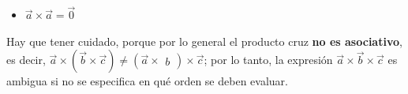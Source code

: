 \documentclass[12pt, fleqn]{report}                             %
\newenvironment{SmallIndentation}[1][0.75em]                    %
        {\begin{adjustwidth}{#1}{}\begin{footnotesize}}             %
        {\end{footnotesize}\end{adjustwidth}}                       %
\DeclareMathOperator \Space {\quad}                             %
\newcommand \Remember[1]{\Space\text{\scriptsize{#1}}}          %
\theoremstyle{break}                                            %
\newcommand{\Wrap}[1]{\left( #1 \right)}                        %
\newcommand{\abs}[1]{\left\lvert #1 \right\lvert}               %
\newcommand{\Abs}[1]{\left\lVert #1 \right\lVert}               %
\newcommand{\Vector}[1]                                         %
        { \ensuremath{\begin{matrix}#1\end{matrix}} }               %
\newcommand{\Sin}[1]{\sin\Wrap{#1}}                             %
\begin{document}
\begin{itemize}
\begin{SmallIndentation}[1em]
                            Por lo tanto:
                            \begin{align*}
                                \Abs{(k\vec{a}) \times \vec{b}} 
                                    &= \Abs{k\vec{a}} \Abs{\vec{b}} \Sin{\pi-\theta}        &&\Remember{Definición de producto cruz}    \\
                                    &= \abs{k} \Abs{\vec{a}} \Abs{\vec{b}} \Sin{\pi-\theta} &&\Remember{Propiedad de la magnitud}       \\
                                    &= \abs{k} \Abs{\vec{a}} \Abs{\vec{b}} \sin \theta      &&\Remember{Identidad trigonométrica}       \\
                                    &= \abs{k} \Abs{\vec{a} \times \vec{b}}                 &&\Remember{Definición de producto cruz}    \\
                                    &= \Abs{k\Wrap{\vec{a} \times \vec{b}}}                 &&\Remember{Propiedad de la magnitud}
                            \end{align*}
                            Por lo tanto, también en este caso tenemos que:
                            $\Wrap{k\vec{a}} \times \vec{b} = k\Wrap{\vec{a} \times \vec{b}}$.
                            
                            Se queda como ejercicio ver que $k\Wrap{\vec{a} \times \vec{b}} = \vec{a} \times \Wrap{k \vec{b}}$
                                
                        \end{SmallIndentation}
                    
                    \item $\vec{a} \times \vec{a} = \vec{0}$

                \end{itemize}
            
                Hay que tener cuidado, porque por lo general el producto cruz \textbf{no es asociativo},
                es decir, $\vec{a} \times \Wrap{\vec{b} \times \vec{c}} \neq \Wrap{\vec{a} \times \Vector{b}} \times \vec{c}$;
                por lo tanto, la expresión $\vec{a} \times \vec{b} \times \vec{c}$ es ambigua si no se especifica en qué orden
                se deben evaluar.
                




            \clearpage
\end{document}
